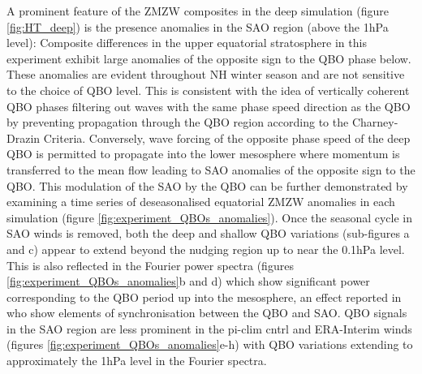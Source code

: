 A prominent feature of the ZMZW composites in the deep simulation (figure \ref{fig:HT_deep}) is the presence anomalies in the SAO region (above the 1hPa level): Composite differences in the upper equatorial stratosphere in this experiment exhibit large anomalies of the opposite sign to the QBO phase below. These anomalies are evident throughout NH winter season and are not sensitive to the choice of QBO level. This is consistent with the idea of vertically coherent QBO phases filtering out waves with the same phase speed direction as the QBO by preventing propagation through the QBO region according to the Charney-Drazin Criteria. Conversely, wave forcing of the opposite phase speed of the deep QBO is permitted to propagate into the lower mesosphere where momentum is transferred to the mean flow leading to SAO anomalies of the opposite sign to the QBO. This modulation of the SAO by the QBO can be further demonstrated by examining a time series of deseasonalised equatorial ZMZW anomalies in each simulation (figure \ref{fig:experiment_QBOs_anomalies}). Once the seasonal cycle in SAO winds is removed, both the deep and shallow QBO variations (sub-figures a and c) appear to extend beyond the nudging region up to near the 0.1hPa level. This is also reflected in the Fourier power spectra (figures \ref{fig:experiment_QBOs_anomalies}b and d) which show significant power corresponding to the QBO period up into the mesosphere, an effect reported in \cite{kuaiNonstationary2009c} who show elements of synchronisation between the QBO and SAO. QBO signals in the SAO region are less prominent in the pi-clim cntrl and ERA-Interim winds (figures \ref{fig:experiment_QBOs_anomalies}e-h) with QBO variations extending to approximately the 1hPa level in the Fourier spectra. 

